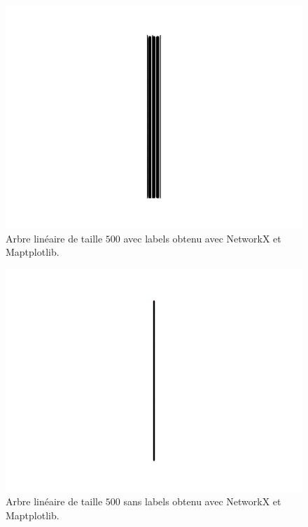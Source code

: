\begin{figure}[h]
\includegraphics[width=\columnwidth]{testNetworkx500A}
\caption{Arbre linéaire de taille $500$ avec labels obtenu avec NetworkX et Maptplotlib. \label{arbre500NkxA}}
\end{figure}

\begin{figure}[h]
\includegraphics[width=\columnwidth]{testNetworkx500B}
\caption{Arbre linéaire de taille $500$ sans labels obtenu avec NetworkX et Maptplotlib. \label{arbre500NkxB}}
\end{figure}

